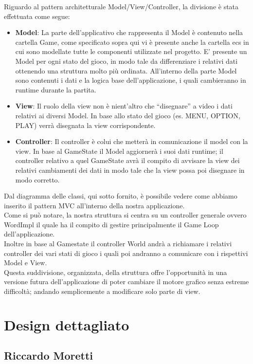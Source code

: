 \documentclass[a4paper,12pt]{report}
\begin{document}
Riguardo al pattern architetturale Model/View/Controller, la divisione è stata effettuata come segue:
\begin{itemize}
    \item \textbf{Model}: La parte dell’applicativo che rappresenta il Model è contenuto nella cartella Game, come specificato sopra qui vi è presente anche la cartella ecs in cui sono modellate tutte le componenti utilizzate nel progetto. E’ presente un Model per ogni stato del gioco, in modo tale da differenziare i relativi dati ottenendo una struttura molto più ordinata. All’interno della parte Model sono contenuti i dati e la logica base dell’applicazione, i quali cambieranno in runtime durante la partita.
    \item \textbf{View}: Il ruolo della view non è nient'altro che “disegnare” a video i dati relativi ai diversi Model. In base allo stato del gioco (es. MENU, OPTION, PLAY) verrà disegnata la view corrispondente.
    \item \textbf{Controller}: Il controller è colui che metterà in comunicazione il model con la view. In base al GameState il Model aggiornerà i suoi dati runtime; il controller relativo a quel GameState avrà il compito di avvisare la view dei relativi cambiamenti dei dati in modo tale che la view possa poi disegnare in modo corretto.
\end{itemize}
Dal diagramma delle classi, qui sotto fornito, è possibile vedere come abbiamo inserito il pattern MVC all’interno della nostra applicazione.
\\
Come si può notare, la nostra struttura si centra su un controller generale ovvero WordImpl il quale ha il compito di gestire principalmente il Game Loop dell'applicazione.
\\
Inoltre in base al Gamestate il controller World andrà a richiamare i relativi controller dei vari stati di gioco i quali poi andranno a comunicare con i rispettivi Model e View.
\\
Questa suddivisione, organizzata, della struttura offre l'opportunità in una versione futura dell’applicazione di poter cambiare il motore grafico senza estreme difficoltà; andando semplicemente a modificare solo parte di view.


\section{Design dettagliato}
%
\subsection*{Riccardo Moretti}
%
\end{document}
